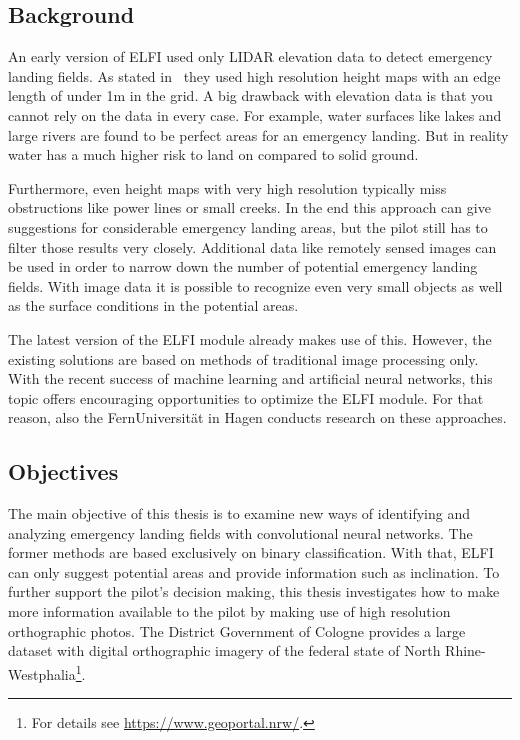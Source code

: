 \subsection{Background}
An early version of ELFI used only LIDAR elevation data to detect emergency landing fields. As stated in~\cite{feu_elfi} they used high resolution height maps with an edge length of under 1m in the grid. A big drawback with elevation data is that you cannot rely on the data in every case. For example, water surfaces like lakes and large rivers are found to be perfect areas for an emergency landing. But in reality water has a much higher risk to land on compared to solid ground.

Furthermore, even height maps with very high resolution typically miss obstructions like power lines or small creeks. In the end this approach can give suggestions for considerable emergency landing areas, but the pilot still has to filter those results very closely. Additional data like remotely sensed images can be used in order to narrow down the number of potential emergency landing fields. With image data it is possible to recognize even very small objects as well as the surface conditions in the potential areas.

The latest version of the ELFI module already makes use of this. However, the existing solutions are based on methods of traditional image processing only. With the recent success of machine learning and artificial neural networks, this topic offers encouraging opportunities to optimize the ELFI module. For that reason, also the FernUniversität in Hagen conducts research on these approaches.

\subsection{Objectives}
The main objective of this thesis is to examine new ways of identifying and analyzing emergency landing fields with convolutional neural networks. The former methods are based exclusively on binary classification. With that, ELFI can only suggest potential areas and provide information such as inclination. To further support the pilot's decision making, this thesis investigates how to make more information available to the pilot by making use of high resolution orthographic photos. The District Government of Cologne provides a large dataset with digital orthographic imagery of the federal state of North Rhine-Westphalia\footnote{For details see \url{https://www.geoportal.nrw/}.}.

